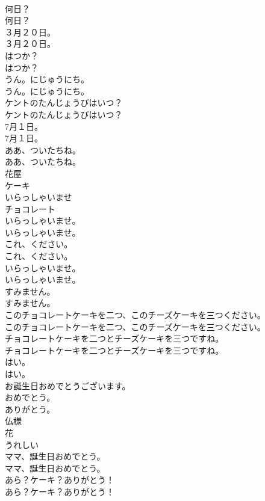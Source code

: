 \documentclass[8pt]{extreport}
\begin{document}
\begin{CJK}{UTF8}{min}
\\	何日？	
\\	何日？ 
\\	３月２０日。	
\\	３月２０日。 
\\	はつか？	
\\	はつか？ 
\\	うん。にじゅうにち。	
\\	うん。にじゅうにち。 
\\	ケントのたんじょうびはいつ？	
\\	ケントのたんじょうびはいつ？ 
\\	7月１日。	
\\	7月１日。 
\\	ああ、ついたちね。	
\\	ああ、ついたちね。 
\\	花屋
\\	ケーキ
\\	いらっしゃいませ
\\	チョコレート
\\	いらっしゃいませ。	
\\	いらっしゃいませ。 
\\	これ、ください。	
\\	これ、ください。 
\\	いらっしゃいませ。	
\\	いらっしゃいませ。 
\\	すみません。	
\\	すみません。 
\\	このチョコレートケーキを二つ、このチーズケーキを三つください。	
\\	このチョコレートケーキを二つ、このチーズケーキを三つください。 
\\	チョコレートケーキを二つとチーズケーキを三つですね。	
\\	チョコレートケーキを二つとチーズケーキを三つですね。 
\\	はい。	
\\	はい。 
\\	お誕生日おめでとうございます。
\\	おめでとう。
\\	ありがとう。
\\	仏様
\\	花
\\	うれしい
\\	ママ、誕生日おめでとう。	
\\	ママ、誕生日おめでとう。 
\\	あら？ケーキ？ありがとう！	
\\	あら？ケーキ？ありがとう！ 

\end{CJK}
\end{document}
